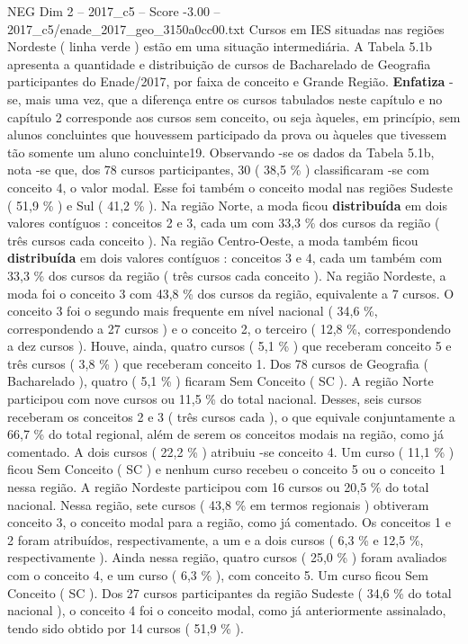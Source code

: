 \begin{textsample}{NEG Dim 2 – 2017\_c5 – Score -3.00 – 2017\_c5/enade\_2017\_geo\_3150a0cc00.txt}
Cursos em IES situadas nas regiões Nordeste ( linha verde ) estão em uma situação intermediária.
A Tabela 5.1b apresenta a quantidade e distribuição de cursos de Bacharelado de Geografia participantes do Enade/2017, por faixa de conceito e Grande Região. \textbf{Enfatiza} -se, mais uma vez, que a diferença entre os cursos tabulados neste capítulo e no capítulo 2 corresponde aos cursos sem conceito, ou seja àqueles, em princípio, sem alunos concluintes que houvessem participado da prova ou àqueles que tivessem tão somente um aluno concluinte19.
Observando -se os dados da Tabela 5.1b, nota -se que, dos 78 cursos participantes, 30 ( 38,5 \% ) classificaram -se com conceito 4, o valor modal.
Esse foi também o conceito modal nas regiões Sudeste ( 51,9 \% ) e Sul ( 41,2 \% ).
Na região Norte, a moda ficou \textbf{distribuída} em dois valores contíguos : conceitos 2 e 3, cada um com 33,3 \% dos cursos da região ( três cursos cada conceito ).
Na região Centro-Oeste, a moda também ficou \textbf{distribuída} em dois valores contíguos : conceitos 3 e 4, cada um também com 33,3 \% dos cursos da região ( três cursos cada conceito ).
Na região Nordeste, a moda foi o conceito 3 com 43,8 \% dos cursos da região, equivalente a 7 cursos.
O conceito 3 foi o segundo mais frequente em nível nacional ( 34,6 \%, correspondendo a 27 cursos ) e o conceito 2, o terceiro ( 12,8 \%, correspondendo a dez cursos ).
Houve, ainda, quatro cursos ( 5,1 \% ) que receberam conceito 5 e três cursos ( 3,8 \% ) que receberam conceito 1.
Dos 78 cursos de Geografia ( Bacharelado ), quatro ( 5,1 \% ) ficaram Sem Conceito ( SC ).
A região Norte participou com nove cursos ou 11,5 \% do total nacional.
Desses, seis cursos receberam os conceitos 2 e 3 ( três cursos cada ), o que equivale conjuntamente a 66,7 \% do total regional, além de serem os conceitos modais na região, como já comentado.
A dois cursos ( 22,2 \% ) atribuiu -se conceito 4.
Um curso ( 11,1 \% ) ficou Sem Conceito ( SC ) e nenhum curso recebeu o conceito 5 ou o conceito 1 nessa região.
A região Nordeste participou com 16 cursos ou 20,5 \% do total nacional.
Nessa região, sete cursos ( 43,8 \% em termos regionais ) obtiveram conceito 3, o conceito modal para a região, como já comentado.
Os conceitos 1 e 2 foram atribuídos, respectivamente, a um e a dois cursos ( 6,3 \% e 12,5 \%, respectivamente ).
Ainda nessa região, quatro cursos ( 25,0 \% ) foram avaliados com o conceito 4, e um curso ( 6,3 \% ), com conceito 5.
Um curso ficou Sem Conceito ( SC ).
Dos 27 cursos participantes da região Sudeste ( 34,6 \% do total nacional ), o conceito 4 foi o conceito modal, como já anteriormente assinalado, tendo sido obtido por 14 cursos ( 51,9 \% ).

\end{textsample}

